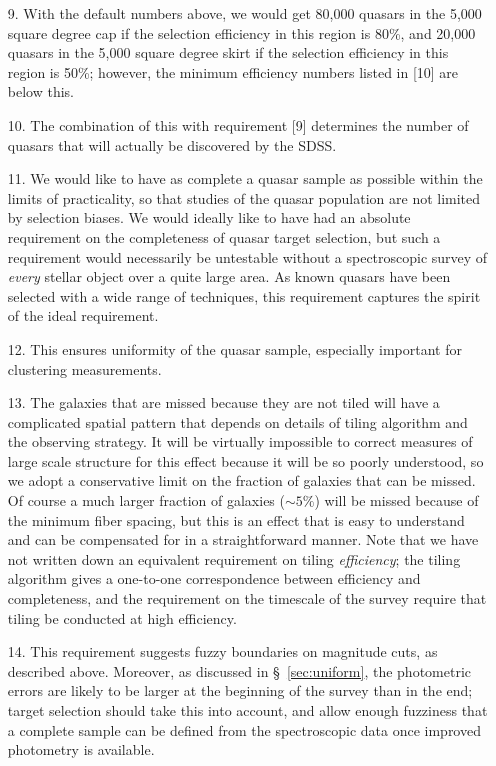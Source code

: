 \begin{enumerate}
\item[9.] With the default numbers above, we would get
80,000 quasars in the 5,000 square degree cap if the selection efficiency
in this region is 80\%, and 20,000 quasars in the 5,000 square degree
skirt if the selection efficiency in this region is 50\%; however, the
minimum efficiency numbers listed in [10] are below this.
\item[10.] The combination of this with requirement [9]
determines the number of quasars that will actually be discovered
by the SDSS.  
\item[11.] We would like to have as complete a quasar sample as possible
within the limits of practicality, so that studies of the quasar
population are not limited by selection biases.  We would ideally like
to have had an absolute requirement on the
completeness of quasar target selection, but such a requirement would
necessarily be untestable without a spectroscopic survey of {\em
every} stellar object over a quite large area.  As known quasars have
been selected with a wide range of techniques, this requirement
captures the spirit of the ideal requirement. 
\item[12.] This ensures uniformity of the quasar sample,
especially important for clustering measurements.
\item[13.] The galaxies that are missed because they are not tiled will
have a complicated spatial pattern that depends on details of tiling
algorithm and the observing strategy.  It will be virtually impossible
to correct measures of large scale structure for this effect because
it will be so poorly understood, so we adopt a conservative limit on
the fraction of galaxies that can be missed.  Of course a much larger
fraction of galaxies ($\sim 5\%$) will be missed because of the 
minimum fiber spacing, but this is an effect that is easy to understand
and can be compensated for in a straightforward manner.  Note that we
have not written down an equivalent requirement on tiling {\em
efficiency}; the tiling algorithm gives a one-to-one correspondence
between efficiency and completeness, and the requirement on the
timescale of the survey require that tiling be conducted at high
efficiency. 
\item[14.] This requirement suggests fuzzy boundaries on magnitude
cuts, as described above.   Moreover, as discussed in
\S~\ref{sec:uniform}, the photometric errors are likely to be larger
at the beginning of the survey than in the end; target selection
should take this into account, and allow enough fuzziness that a
complete sample can be defined from the spectroscopic data once
improved photometry is available. 
\end{enumerate}


